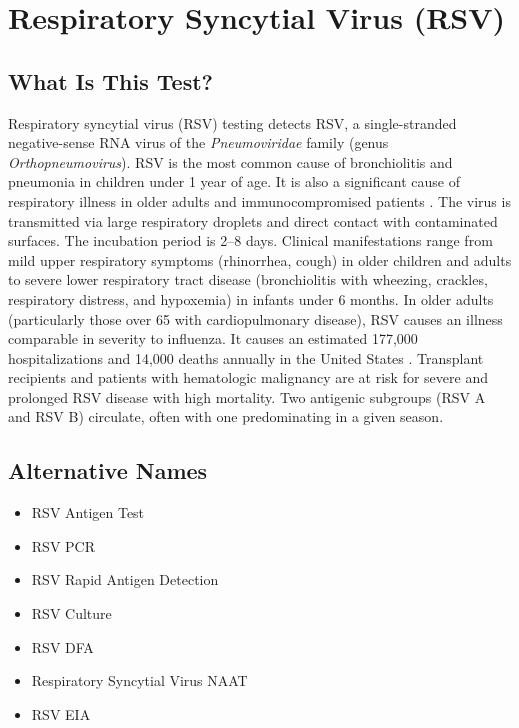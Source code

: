 \chapter{Respiratory Syncytial Virus (RSV)}

\section*{What Is This Test?}
Respiratory syncytial virus (RSV) testing detects RSV, a single-stranded negative-sense RNA virus of the \textit{Pneumoviridae} family (genus \textit{Orthopneumovirus}). RSV is the most common cause of bronchiolitis and pneumonia in children under 1 year of age. It is also a significant cause of respiratory illness in older adults and immunocompromised patients \cite{hall2009burden}. The virus is transmitted via large respiratory droplets and direct contact with contaminated surfaces. The incubation period is 2--8 days. Clinical manifestations range from mild upper respiratory symptoms (rhinorrhea, cough) in older children and adults to severe lower respiratory tract disease (bronchiolitis with wheezing, crackles, respiratory distress, and hypoxemia) in infants under 6 months. In older adults (particularly those over 65 with cardiopulmonary disease), RSV causes an illness comparable in severity to influenza. It causes an estimated 177,000 hospitalizations and 14,000 deaths annually in the United States \cite{falsey2005respiratory}. Transplant recipients and patients with hematologic malignancy are at risk for severe and prolonged RSV disease with high mortality. Two antigenic subgroups (RSV A and RSV B) circulate, often with one predominating in a given season.

\section*{Alternative Names}
\begin{itemize}
  \item RSV Antigen Test
  \item RSV PCR
  \item RSV Rapid Antigen Detection
  \item RSV Culture
  \item RSV DFA
  \item Respiratory Syncytial Virus NAAT
  \item RSV EIA
\end{itemize}
